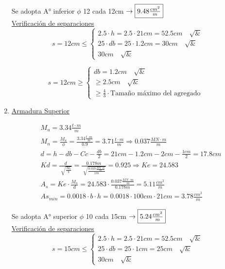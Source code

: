 \begin{enumerate}
Se adopta A° inferior $\phi$ 12 cada 12cm $\rightarrow \framebox{$9.48 \frac{cm^2}{m}$}$ \\

\underline{Verificación de separaciones}\\

\[ s = 12cm \leq \left\{ \begin{array}{ll}
         2.5 \cdot h = 2.5 \cdot 21cm = 52.5cm \quad \surd & \\
         25 \cdot db = 25 \cdot 1.2cm = 30cm \quad \surd &\\
         30cm \quad \surd & \end{array} \right. \] 
         
\[ s = 12cm \geq \left\{ \begin{array}{ll}
         db = 1.2cm \quad \surd & \\
         \geq 2.5cm \quad \surd &\\
         \geq \frac{4}{3} \cdot \text{Tamaño máximo del agregado} & \end{array} \right. \] 

\item \underline{Armadura Superior}

\begin{align*}
& M_u = 3.34 \frac{t \cdot m}{m} \\
& M_n = \frac{M_u}{\phi} = \frac{3.34 \frac{t \cdot m}{m}}{0.9} = 3.71 \frac{t \cdot m}{m} \Rightarrow 0.037 \frac{MN \cdot m}{m} \\
& d = h -db - Cc - \frac{db}{2}= 21cm - 1.2cm - 2cm - \frac{1cm}{2}= 17.8cm \\
& Kd = \frac{d}{\sqrt[]{\frac{M_n}{b}}} = \frac{0.178m}{\sqrt[]{\frac{0.037 \frac{MN \cdot m}{m}}{1m}}} = 0.925 \Rightarrow Ke = 24.583 \\
& A_s = Ke \cdot \frac{M_n}{d} = 24.583 \cdot \frac{0.037 \frac{MN \cdot m}{m}}{0.178m} = 5.11 \frac{cm^2}{m}\\
& As_{min} = 0.0018 \cdot b \cdot h = 0.0018 \cdot 100cm \cdot 21cm = 3.78 \frac{cm^2}{m}
\end{align*}

Se adopta A° superior $\phi$ 10 cada 15cm $\rightarrow \framebox{$5.24 \frac{cm^2}{m}$}$ \\

\underline{Verificación de separaciones}\\

\[ s = 15cm \leq \left\{ \begin{array}{ll}
         2.5 \cdot h = 2.5 \cdot 21cm = 52.5cm \quad \surd & \\
         25 \cdot db = 25 \cdot 1cm = 25cm \quad \surd &\\
         30cm \quad \surd & \end{array} \right. \] 
         

\end{enumerate}
